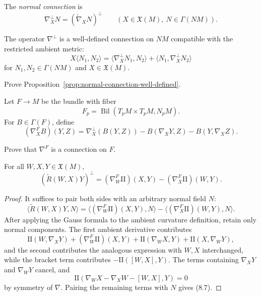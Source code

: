 The \emph{normal connection} is
\[
\nabla_X^\perp N=(\widetilde\nabla_XN)^\perp
\qquad
(X\in\mathfrak X(M),\ N\in\Gamma(NM)).
\]

\begin{proposition}
\label{prop:normal-connection-well-defined}

The operator $\nabla^\perp$ is a well-defined connection on $NM$ compatible
with the restricted ambient metric:
\[
X\langle N_1,N_2\rangle
=\langle\nabla_X^\perp N_1,N_2\rangle
 +\langle N_1,\nabla_X^\perp N_2\rangle
\]
for $N_1,N_2\in\Gamma(NM)$ and $X\in\mathfrak X(M)$.
\end{proposition}

\begin{exercise}
\label{exer:prove-normal-connection}

Prove Proposition~\ref{prop:normal-connection-well-defined}.
\end{exercise}

Let $F\to M$ be the bundle with fiber
\[
F_p=\operatorname{Bil}(T_pM\times T_pM,N_pM).
\]
For $B\in\Gamma(F)$, define
\[
(\nabla_X^FB)(Y,Z)
=\nabla_X^\perp(B(Y,Z))
-B(\nabla_XY,Z)-B(Y,\nabla_XZ).
\]

\begin{exercise}
\label{exer:connection-in-bundle}

Prove that $\nabla^F$ is a connection on $F$.
\end{exercise}

\begin{theorem}
\label{thm:codazzi-equation}

For all $W,X,Y\in\mathfrak X(M)$,
\begin{equation}
(\widetilde R(W,X)Y)^\perp
=(\nabla_W^F\mathrm{II})(X,Y)-(\nabla_X^F\mathrm{II})(W,Y).
\tag{8.6}
\end{equation}
\end{theorem}

\begin{proof}
\sketch It suffices to pair both sides with an arbitrary normal field $N$:
\begin{equation}
\langle\widetilde R(W,X)Y,N\rangle
=\langle(\nabla_W^F\mathrm{II})(X,Y),N\rangle
-\langle(\nabla_X^F\mathrm{II})(W,Y),N\rangle.
\tag{8.7}
\end{equation}
After applying the Gauss formula to the ambient curvature definition, retain
only normal components. The first ambient derivative contributes
\[
\mathrm{II}(W,\nabla_XY)
+(\nabla_W^F\mathrm{II})(X,Y)
+\mathrm{II}(\nabla_WX,Y)
+\mathrm{II}(X,\nabla_WY),
\]
and the second contributes the analogous expression with $W,X$ interchanged,
while the bracket term contributes $-\mathrm{II}([W,X],Y)$. The terms
containing $\nabla_XY$ and $\nabla_WY$ cancel, and
\[
\mathrm{II}(\nabla_WX-\nabla_XW-[W,X],Y)=0
\]
by symmetry of $\nabla$. Pairing the remaining terms with $N$ gives (8.7).
\end{proof}

